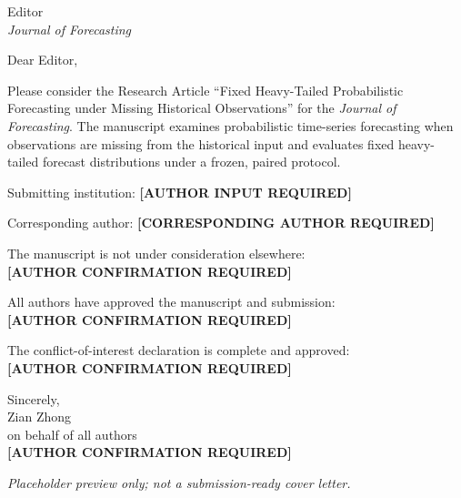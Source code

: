\documentclass[11pt]{article}
\begin{document}
\thispagestyle{empty}
\noindent Editor\\
\emph{Journal of Forecasting}

\vspace{1em}
\noindent Dear Editor,

Please consider the Research Article ``Fixed Heavy-Tailed Probabilistic Forecasting under Missing Historical Observations'' for the \emph{Journal of Forecasting}. The manuscript examines probabilistic time-series forecasting when observations are missing from the historical input and evaluates fixed heavy-tailed forecast distributions under a frozen, paired protocol.

Submitting institution: \textbf{[AUTHOR INPUT REQUIRED]}

Corresponding author: \textbf{[CORRESPONDING AUTHOR REQUIRED]}

The manuscript is not under consideration elsewhere:\\
\textbf{[AUTHOR CONFIRMATION REQUIRED]}

All authors have approved the manuscript and submission:\\
\textbf{[AUTHOR CONFIRMATION REQUIRED]}

The conflict-of-interest declaration is complete and approved:\\
\textbf{[AUTHOR CONFIRMATION REQUIRED]}

\noindent Sincerely,\\
Zian Zhong\\
on behalf of all authors\\
\textbf{[AUTHOR CONFIRMATION REQUIRED]}

\vfill
\noindent\textit{Placeholder preview only; not a submission-ready cover letter.}
\end{document}

